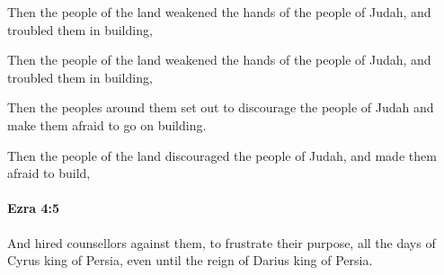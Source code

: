 			Then the people of the land weakened the hands of the people of Judah, and troubled them in building,

			\begin{versebox}
					\item[BHS] 
					\item[LXX] 
					\item[ASV] Then the people of the land weakened the hands of the people of Judah, and troubled them in building,
					\item[NIV] Then the peoples around them set out to discourage the people of Judah and make them afraid to go on building.
					\item[NRSV] Then the people of the land discouraged the people of Judah, and made them afraid to build,
			\end{versebox}

		\paragraph{Ezra 4:5} %
			\label{EZRA-4-5}

			And hired counsellors against them, to frustrate their purpose, all the days of Cyrus king of Persia, even until the reign of Darius king of Persia.

